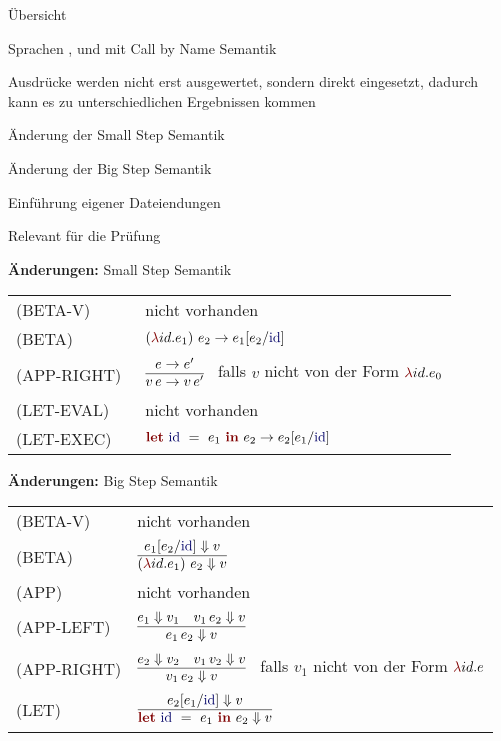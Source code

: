 {
  \begin{itemgroup}{Übersicht}
    \item Sprachen \LZEROCBN, \LONECBN und \LTWOCBN  mit Call by Name Semantik
    \item Ausdrücke werden nicht erst ausgewertet, sondern direkt eingesetzt,
          dadurch kann es zu unterschiedlichen Ergebnissen kommen
    \item Änderung der Small Step Semantik
    \item Änderung der Big Step Semantik
    \item Einführung eigener Dateiendungen
    \item Relevant für die Prüfung \glqq \TPONE \grqq
  \end{itemgroup}
}


{
  {\bf Änderungen:} Small Step Semantik\\[5mm]
  \begin{tabular}{ll}
     \mbox{(BETA-V)}      & nicht vorhanden \\[3mm]
     \mbox{(BETA)}        & $\ExprApplication{\Parenthesis{\ExprLambda{id}{}{e_1}}}{e_2} \to
                                               e_1[e_2/\ExprIdentifier{id}]$ \\[3mm]
     \mbox{(APP-RIGHT)\ } & $\regel{e \to e'}
                                   {v\,e \to v\,e'}$ \ 
                                   falls ${v}$ nicht von der Form $\ExprLambda{id}{}{e_0}$ \\[5mm]
     \mbox{(LET-EVAL)\  } & nicht vorhanden \\[3mm]
     \mbox{(LET-EXEC)}    & $\ExprLet{\ExprIdentifier{id}}{}{e_1}{e_2} \to
                                      e_2[e_1/\ExprIdentifier{id}]$ \\[3mm]
  \end{tabular}
}


{
  {\bf Änderungen:} Big Step Semantik\\[5mm]
  \begin{tabular}{ll}
     \mbox{(BETA-V)}      & nicht vorhanden \\[3mm]
     \mbox{(BETA)}        & $\regel{e_1[e_2/\ExprIdentifier{id}] \eval v}
                                   {\ExprApplication{\Parenthesis{\ExprLambda{id}{}{e_1}}}{e_2} \eval v}$ \\[5mm]
     \mbox{(APP)}         & nicht vorhanden \\[3mm]
     \mbox{(APP-LEFT)}    & $\regel{e_1 \eval v_1 \quad v_1\,e_2 \eval v}
                                   {e_1\,e_2 \eval v}$ \\[5mm]
     \mbox{(APP-RIGHT)}   & $\regel{e_2 \eval v_2 \quad v_1\,v_2 \eval v}
                                   {v_1\,e_2 \eval v}$ \ 
                                   falls ${v_1}$ nicht von der Form $\ExprLambda{id}{}{e}$ \\[5mm]
     \mbox{(LET)}         & $\regel{e_2[e_1/\ExprIdentifier{id}] \eval v}
                                   {\ExprLet{\ExprIdentifier{id}}{}{e_1}{e_2} \eval v}$ \\[5mm]
  \end{tabular}
}


